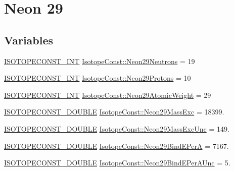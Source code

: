 \hypertarget{group___isotope_const-_neon-_ne29}{}\section{Neon 29}
\label{group___isotope_const-_neon-_ne29}
\subsection*{Variables}
\begin{DoxyCompactItemize}
\item 
\mbox{\hyperlink{group___isotope_const-_macros_ga5f18360b3e99483a35c32d789e62621c}{I\+S\+O\+T\+O\+P\+E\+C\+O\+N\+S\+T\+\_\+\+I\+NT}} \mbox{\hyperlink{group___isotope_const-_neon-_ne29_ga4640af8fbe636703364fdf23216db66e}{Isotope\+Const\+::\+Neon29\+Neutrons}} = 19
\item 
\mbox{\hyperlink{group___isotope_const-_macros_ga5f18360b3e99483a35c32d789e62621c}{I\+S\+O\+T\+O\+P\+E\+C\+O\+N\+S\+T\+\_\+\+I\+NT}} \mbox{\hyperlink{group___isotope_const-_neon-_ne29_gac503371b6f7fde64ef381c4a90723dc0}{Isotope\+Const\+::\+Neon29\+Protons}} = 10
\item 
\mbox{\hyperlink{group___isotope_const-_macros_ga5f18360b3e99483a35c32d789e62621c}{I\+S\+O\+T\+O\+P\+E\+C\+O\+N\+S\+T\+\_\+\+I\+NT}} \mbox{\hyperlink{group___isotope_const-_neon-_ne29_gaef92645ad805a8d07a0bce7e695db257}{Isotope\+Const\+::\+Neon29\+Atomic\+Weight}} = 29
\item 
\mbox{\hyperlink{group___isotope_const-_macros_ga8f45a7272ce02c0b4c65c44636ed719a}{I\+S\+O\+T\+O\+P\+E\+C\+O\+N\+S\+T\+\_\+\+D\+O\+U\+B\+LE}} \mbox{\hyperlink{group___isotope_const-_neon-_ne29_ga9e9f643d8cff68f321e1e48f6c030fa7}{Isotope\+Const\+::\+Neon29\+Mass\+Exc}} = 18399.
\item 
\mbox{\hyperlink{group___isotope_const-_macros_ga8f45a7272ce02c0b4c65c44636ed719a}{I\+S\+O\+T\+O\+P\+E\+C\+O\+N\+S\+T\+\_\+\+D\+O\+U\+B\+LE}} \mbox{\hyperlink{group___isotope_const-_neon-_ne29_gad6cee212302aeab562231d26b8897e17}{Isotope\+Const\+::\+Neon29\+Mass\+Exc\+Unc}} = 149.
\item 
\mbox{\hyperlink{group___isotope_const-_macros_ga8f45a7272ce02c0b4c65c44636ed719a}{I\+S\+O\+T\+O\+P\+E\+C\+O\+N\+S\+T\+\_\+\+D\+O\+U\+B\+LE}} \mbox{\hyperlink{group___isotope_const-_neon-_ne29_gadcd62f0d5af687618903a5fffcee2694}{Isotope\+Const\+::\+Neon29\+Bind\+E\+PerA}} = 7167.
\item 
\mbox{\hyperlink{group___isotope_const-_macros_ga8f45a7272ce02c0b4c65c44636ed719a}{I\+S\+O\+T\+O\+P\+E\+C\+O\+N\+S\+T\+\_\+\+D\+O\+U\+B\+LE}} \mbox{\hyperlink{group___isotope_const-_neon-_ne29_gabc79457ca4d84dbacb872f337ac422f5}{Isotope\+Const\+::\+Neon29\+Bind\+E\+Per\+A\+Unc}} = 5.

\end{DoxyCompactItemize}

